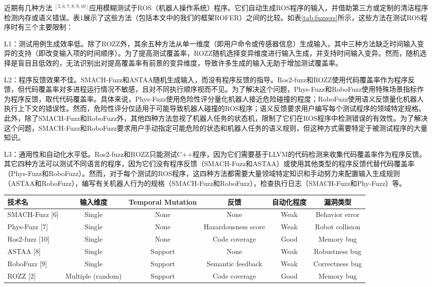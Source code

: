 近期有几种方法 $^{[2, 6, 7, 8, 9, 10]}$应用模糊测试于ROS（机器人操作系统）程序。它们自动生成ROS程序的输入，并借助第三方或定制的清洁程序检测内存或语义错误。表1展示了这些方法（包括本文中的我们的框架ROFER）之间的比较。如表\ref{tab:fuzzers}所示，这些方法在测试ROS程序时有三个主要限制：

L1：测试用例生成效率低。除了ROZZ外，其余五种方法从单一维度（即用户命令或传感器信息）生成输入，其中三种方法缺乏时间输入变异的支持（即改变输入项的时间顺序）。为了提高测试覆盖率，ROZZ随机选择变异维度进行输入生成，并支持时间输入变异。然而，随机选择是盲目且低效的，无法识别出对提高覆盖率有前景的变异维度，导致许多生成的输入无助于增加测试覆盖率。

L2：程序反馈效果不佳。SMACH-Fuzz和ASTAA随机生成输入，而没有程序反馈的指导。Ros2-fuzz和ROZZ使用代码覆盖率作为程序反馈，但代码覆盖率对多进程运行情况不敏感，且对不同执行顺序视而不见。为了解决这个问题，Phys-Fuzz和RoboFuzz使用特殊场景指标作为程序反馈，取代代码覆盖率。具体来说，Phys-Fuzz使用危险性评分量化机器人接近危险碰撞的程度；RoboFuzz使用语义反馈量化机器人执行上下文的错误性。然而，危险性评分仅适用于可能导致机器人碰撞的ROS程序；语义反馈要求用户编写每个测试程序的领域特定规格。此外，除了SMACH-Fuzz和RoboFuzz外，其他四种方法忽视了机器人任务的状态机，限制了它们在ROS程序中检测错误的有效性。为了解决这个问题，SMACH-Fuzz和RoboFuzz要求用户手动指定可能危险的状态和机器人任务的语义规则，但这种方式需要特定于被测试程序的大量知识。

L3：通用性和自动化水平低。Ros2-fuzz和ROZZ只能测试C++程序，因为它们需要基于LLVM的代码检测来收集代码覆盖率作为程序反馈。其它四种方法可以测试不同语言的程序，因为它们没有程序反馈（SMACH-Fuzz和ASTAA）或使用其他类型的程序反馈代替代码覆盖率（Phys-Fuzz和RoboFuzz）。然而，对于每个测试的ROS程序，这四种方法都需要大量领域特定知识和手动努力来配置输入生成规则（ASTAA和RoboFuzz），编写有关机器人行为的规格（SMACH-Fuzz和RoboFuzz），检查执行日志（SMACH-Fuzz和Phy-Fuzz）等。

\begin{table*}[t]
\small
\centering
\caption{最新针对ROS系统的Fuzz技术对比}
\begin{tabular}{lccccc}
\hline
\textbf{技术名} & \textbf{输入维度} & \textbf{Temporal Mutation} & \textbf{反馈}& \textbf{自动化程度} & \textbf{漏洞类型} \\ \hline\hline
SMACH-Fuzz [6] & Single & None & None& Weak & Behavior error \\ \hline
Phys-Fuzz [7] & Single & None & Hazardousness score  & Weak & Robot collision \\ \hline
Ros2-fuzz [10] & Single & None & Code coverage   & Good & Memory bug \\ \hline
ASTAA [8] & Single & Support & None  & Weak & Robustness bug \\ \hline
RoboFuzz [9] & Single & Support & Semantic feedback & Weak & Correctness bug \\ \hline
ROZZ [2] & Multiple (random) & Support & Code coverage & Good & Memory bug \\ \hline
\end{tabular}
\label{tab:fuzzers}
\end{table*}
